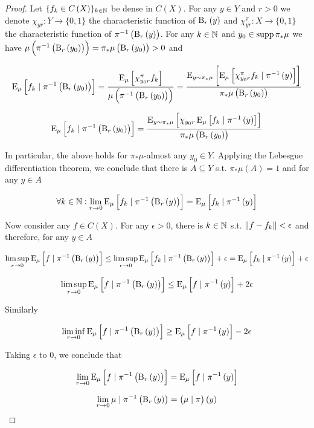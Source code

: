 \begin{proof}

Let $\{f_k \in C\left(X\right)\}_{k \in \mathbb{N}}$ be dense in $C\left(X\right)$. For any $y \in Y$ and $r > 0$ we denote $\chi_{yr}: Y \rightarrow \{0,1\}$ the characteristic function of $\operatorname{B}_r\left(y\right)$ and $\chi^\pi_{yr}: X \rightarrow \{0,1\}$ the characteristic function of $\pi^{-1}\left(\operatorname{B}_r\left(y\right)\right)$. For any $k \in \mathbb{N}$ and $y_0 \in \operatorname{supp} \pi_* \mu$ we have $\mu\left(\pi^{-1}\left(\operatorname{B}_r\left(y_0\right)\right)\right) = \pi_*\mu\left(\operatorname{B}_r\left(y_0\right)\right) > 0$ and

$$\operatorname{E}_{\mu}\left[f_k \mid \pi^{-1}\left(\operatorname{B}_r\left(y_0\right)\right)\right] = \frac{\operatorname{E}_{\mu}\left[\chi^\pi_{y_0r} f_k\right]}{\mu\left(\pi^{-1}\left(\operatorname{B}_r\left(y_0\right)\right)\right)} = \frac{\operatorname{E}_{y \sim \pi_* \mu}\left[\operatorname{E}_{\mu}\left[\chi^\pi_{y_0r} f_k \mid \pi^{-1}\left(y\right)\right]\right]}{\pi_*\mu\left(\operatorname{B}_r\left(y_0\right)\right)}$$

$$\operatorname{E}_{\mu}\left[f_k \mid \pi^{-1}\left(\operatorname{B}_r\left(y_0\right)\right)\right] = \frac{\operatorname{E}_{y \sim \pi_* \mu}\left[\chi_{y_0r} \operatorname{E}_{\mu}\left[f_k \mid \pi^{-1}\left(y\right)\right]\right]}{\pi_*\mu\left(\operatorname{B}_r\left(y_0\right)\right)}$$

In particular, the above holds for $\pi_* \mu$-almost any $y_0 \in Y$. Applying the Lebesgue differentiation theorem, we conclude that there is $A \subseteq Y$ s.t. $\pi_*\mu\left(A\right) = 1$ and for any $y \in A$

$$\forall k \in \mathbb{N}: \lim_{r \rightarrow 0} \operatorname{E}_{\mu}\left[f_k \mid \pi^{-1}\left(\operatorname{B}_r\left(y\right)\right)\right] = \operatorname{E}_{\mu}\left[f_k \mid \pi^{-1}\left(y\right)\right]$$

Now consider any $f \in C\left(X\right)$. For any $\epsilon > 0$, there is $k \in \mathbb{N}$ s.t. $\lVert f-f_k \rVert < \epsilon$ and therefore, for any $y \in A$

$$\limsup_{r \rightarrow 0} \operatorname{E}_{\mu}\left[f \mid \pi^{-1}\left(\operatorname{B}_r\left(y\right)\right)\right] \leq \limsup_{r \rightarrow 0} \operatorname{E}_{\mu}\left[f_k \mid \pi^{-1}\left(\operatorname{B}_r\left(y\right)\right)\right] + \epsilon = \operatorname{E}_{\mu}\left[f_k \mid \pi^{-1}\left(y\right)\right] + \epsilon  $$

$$\limsup_{r \rightarrow 0} \operatorname{E}_{\mu}\left[f \mid \pi^{-1}\left(\operatorname{B}_r\left(y\right)\right)\right] \leq \operatorname{E}_{\mu}\left[f \mid \pi^{-1}\left(y\right)\right] + 2\epsilon$$

Similarly

$$\liminf_{r \rightarrow 0} \operatorname{E}_{\mu}\left[f \mid \pi^{-1}\left(\operatorname{B}_r\left(y\right)\right)\right] \geq \operatorname{E}_{\mu}\left[f \mid \pi^{-1}\left(y\right)\right] - 2\epsilon$$

Taking $\epsilon$ to 0, we conclude that

$$\lim_{r \rightarrow 0} \operatorname{E}_{\mu}\left[f \mid \pi^{-1}\left(\operatorname{B}_r\left(y\right)\right)\right] = \operatorname{E}_{\mu}\left[f \mid \pi^{-1}\left(y\right)\right]$$

$$\lim_{r \rightarrow 0} \mu \mid \pi^{-1}\left(\operatorname{B}_r\left(y\right)\right) = \left(\mu \mid \pi\right)\left(y\right)$$
\end{proof}

